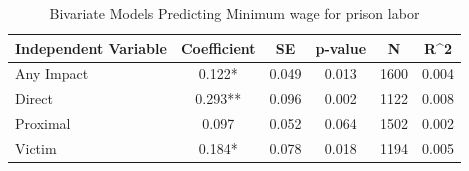 \begin{table}

\caption{\label{tab:tab:min_wage_bivariate}Bivariate Models Predicting Minimum wage for prison labor}
\centering
\begin{tabular}[t]{lccccc}
\toprule
Independent Variable & Coefficient & SE & p-value & N & R\textasciicircum{}2\\
\midrule
Any Impact & 0.122* & 0.049 & 0.013 & 1600 & 0.004\\
Direct & 0.293** & 0.096 & 0.002 & 1122 & 0.008\\
Proximal & 0.097 & 0.052 & 0.064 & 1502 & 0.002\\
Victim & 0.184* & 0.078 & 0.018 & 1194 & 0.005\\
\bottomrule
\end{tabular}
\end{table}
